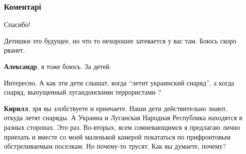  
 
 
 
 
\subsubsection{Коментарі}
\label{sec:05_12_2021.yz.maj_dnr.1.deti_talanty_donbassa.cmt}

\begin{itemize} %

Спасибо!

Детишки это будущее, но что то нехорошее затевается у вас там. Боюсь скоро рванет.


\textbf{Александр}, я тоже боюсь. За детей.

Интересно. А как эти дети слышат, когда \enquote{летит украинский снаряд}, а когда
снаряд, выпущенный лугандонскими террористами ?

\textbf{Кирилл}, зря вы злобствуете и ерничаете. Наши дети действительно знают,
откуда летят снаряды. А Украина и Луганская Народная Республика находятся в
разных сторонах. Это раз. Во-вторых, всем сомневающимся я предлагаю лично
приехать и вместе со моей маленькой камерой покататься по прифронтовым
обстреливаемым поселкам. Но почему-то трусят. Как вы думаете, почему?

\end{itemize} %
